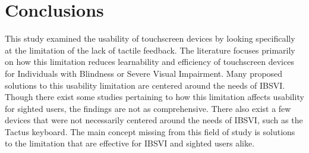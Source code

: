\documentclass[11pt]{article}
\begin{document}
\section{Conclusions}
This study examined the usability of touchscreen devices by looking specifically at the limitation of the lack of tactile feedback. The literature focuses primarily on how this limitation reduces learnability and efficiency of touchscreen devices for Individuals with Blindness or Severe Visual Impairment. Many proposed solutions to this usability limitation are centered around the needs of IBSVI. Though there exist some studies pertaining to how this limitation affects usability for sighted users, the findings are not as comprehensive. There also exist a few devices that were not necessarily centered around the needs of IBSVI, such as the Tactus keyboard. The main concept missing from this field of study is solutions to the limitation that are effective for IBSVI and sighted users alike.

\clearpage


{}

\end{document}
